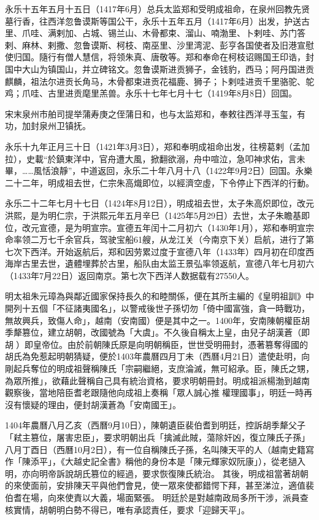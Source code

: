 永乐十五年五月十五日（1417年6月）总兵太监郑和受明成祖命，在泉州回教先贤墓行香，往西洋忽鲁谟斯等国公干，永乐十五年五月（1417年6月）出发，护送古里、爪哇、满剌加、占城、锡兰山、木骨都束、溜山、喃渤里、卜剌哇、苏门答剌、麻林、剌撒、忽鲁谟斯、柯枝、南巫里、沙里湾泥、彭亨各国使者及旧港宣慰使归国。隨行有僧人慧信，将领朱真、唐敬等。郑和奉命在柯枝诏赐国王印诰，封国中大山为镇国山，并立碑铭文。忽鲁谟斯进贡狮子，金钱豹，西马；阿丹国进贡麒麟，祖法尔进贡长角马，木骨都束进贡花福鹿、狮子；卜剌哇进贡千里骆驼、鸵鸡；爪哇、古里进贡麾里羔兽。永乐十七年七月十七（1419年8月8日）回国。

宋末泉州市舶司提举蒲寿庚之侄蒲日和，也与太监郑和，奉敕往西洋寻玉玺，有功，加封泉州卫镇抚。

永乐十九年正月三十日（1421年3月3日），郑和奉明成祖命出发，往榜葛剌（孟加拉），史載“於鎮東洋中，官舟遭大風，掀翻欲溺，舟中喧泣，急叩神求佑，言未畢，……風恬浪靜”，中道返回，永乐二十年八月十八（1422年9月2日）回国。永樂二十二年，明成祖去世，仁宗朱高熾即位，以經濟空虛，下令停止下西洋的行動。

永乐二十二年七月十七日（1424年8月12日），明成祖去世，太子朱高炽即位，改元洪熙，是为明仁宗，于洪熙元年五月辛巳（1425年5月29日）去世，太子朱瞻基即位，改元宣德，是为明宣宗。宣德五年闰十二月初六（1430年1月），郑和奉明宣宗命率领二万七千余官兵，驾驶宝船61艘，从龙江关（今南京下关）启航，进行了第七次下西洋。开始返航后，郑和因劳累过度于宣德八年（1433年）四月初在印度西海岸古里去世，遺體埋葬於古里，船队由太监王景弘率领返航，宣德八年七月初六（1433年7月22日）返回南京。第七次下西洋人数据载有27550人。

明太祖朱元璋為與鄰近國家保持長久的和睦關係，便在其所主編的《皇明祖訓》中開列十五個「不征諸夷國名」，以警戒後世子孫切勿「倚中國富強，貪一時戰功，無故興兵，致傷人命」，越南（安南國）便是其中之一。1400年，安南陳朝權臣胡季犛篡位，建立胡朝，改國號為「大虞」。不久後自稱太上皇，由兒子胡漢蒼（即胡𡗨）即皇帝位。由於前朝陳氏原是向明朝稱臣，世世受明冊封，憑著篡奪得國的胡氏為免惹起明朝猜疑，便於1403年農曆四月丁未（西曆4月21日）遣使赴明，向剛起兵奪位的明成祖聲稱陳氏「宗嗣繼絕，支庶淪滅，無可紹承。臣，陳氏之甥，為眾所推」，欲藉此聲稱自己具有統治資格，要求明朝冊封。明成祖派楊渤到越南觀察後，當地陪臣耆老跟隨他向成祖上奏稱「眾人誠心推𡗨權理國事」，明廷一時再沒有懷疑的理由，便封胡漢蒼為「安南國王」。

1404年農曆八月乙亥（西曆9月10日），陳朝遺臣裴伯耆到明廷，控訴胡季犛父子「弒主篡位，屠害忠臣」，要求明朝出兵「擒滅此賊，蕩除奸凶，復立陳氏子孫」 八月丁酉日（西曆10月2日），有一位自稱陳氏子孫，名叫陳天平的人（越南史籍寫作「陳添平」，《大越史記全書》稱他的身份本是「陳元輝家奴阮康」），從老撾入明，亦向明帝訴說胡氏篡位的經過，要求恢復陳氏統治。 其後，明成祖當著胡朝的來使面前，安排陳天平與他們會見，使一眾來使都錯愕下拜，甚至涕泣，適值裴伯耆在場，向來使責以大義，場面緊張。 明廷於是對越南政局多所干涉，派員查核實情，胡朝明白勢不得已，唯有承認責任，要求「迎歸天平」。

